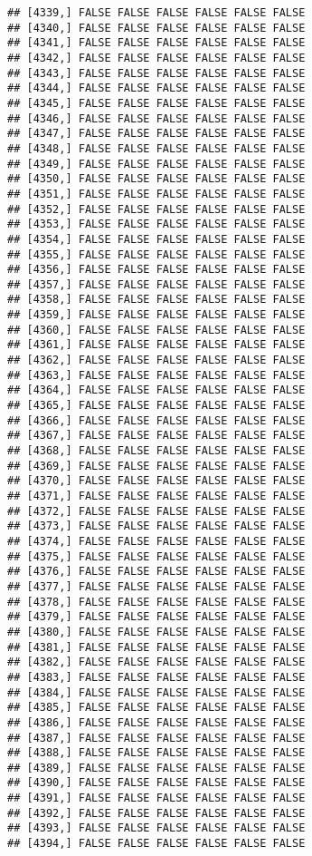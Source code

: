 \documentclass[
]{article}
\begin{document}
\begin{verbatim}
## [4339,] FALSE FALSE FALSE FALSE FALSE FALSE
## [4340,] FALSE FALSE FALSE FALSE FALSE FALSE
## [4341,] FALSE FALSE FALSE FALSE FALSE FALSE
## [4342,] FALSE FALSE FALSE FALSE FALSE FALSE
## [4343,] FALSE FALSE FALSE FALSE FALSE FALSE
## [4344,] FALSE FALSE FALSE FALSE FALSE FALSE
## [4345,] FALSE FALSE FALSE FALSE FALSE FALSE
## [4346,] FALSE FALSE FALSE FALSE FALSE FALSE
## [4347,] FALSE FALSE FALSE FALSE FALSE FALSE
## [4348,] FALSE FALSE FALSE FALSE FALSE FALSE
## [4349,] FALSE FALSE FALSE FALSE FALSE FALSE
## [4350,] FALSE FALSE FALSE FALSE FALSE FALSE
## [4351,] FALSE FALSE FALSE FALSE FALSE FALSE
## [4352,] FALSE FALSE FALSE FALSE FALSE FALSE
## [4353,] FALSE FALSE FALSE FALSE FALSE FALSE
## [4354,] FALSE FALSE FALSE FALSE FALSE FALSE
## [4355,] FALSE FALSE FALSE FALSE FALSE FALSE
## [4356,] FALSE FALSE FALSE FALSE FALSE FALSE
## [4357,] FALSE FALSE FALSE FALSE FALSE FALSE
## [4358,] FALSE FALSE FALSE FALSE FALSE FALSE
## [4359,] FALSE FALSE FALSE FALSE FALSE FALSE
## [4360,] FALSE FALSE FALSE FALSE FALSE FALSE
## [4361,] FALSE FALSE FALSE FALSE FALSE FALSE
## [4362,] FALSE FALSE FALSE FALSE FALSE FALSE
## [4363,] FALSE FALSE FALSE FALSE FALSE FALSE
## [4364,] FALSE FALSE FALSE FALSE FALSE FALSE
## [4365,] FALSE FALSE FALSE FALSE FALSE FALSE
## [4366,] FALSE FALSE FALSE FALSE FALSE FALSE
## [4367,] FALSE FALSE FALSE FALSE FALSE FALSE
## [4368,] FALSE FALSE FALSE FALSE FALSE FALSE
## [4369,] FALSE FALSE FALSE FALSE FALSE FALSE
## [4370,] FALSE FALSE FALSE FALSE FALSE FALSE
## [4371,] FALSE FALSE FALSE FALSE FALSE FALSE
## [4372,] FALSE FALSE FALSE FALSE FALSE FALSE
## [4373,] FALSE FALSE FALSE FALSE FALSE FALSE
## [4374,] FALSE FALSE FALSE FALSE FALSE FALSE
## [4375,] FALSE FALSE FALSE FALSE FALSE FALSE
## [4376,] FALSE FALSE FALSE FALSE FALSE FALSE
## [4377,] FALSE FALSE FALSE FALSE FALSE FALSE
## [4378,] FALSE FALSE FALSE FALSE FALSE FALSE
## [4379,] FALSE FALSE FALSE FALSE FALSE FALSE
## [4380,] FALSE FALSE FALSE FALSE FALSE FALSE
## [4381,] FALSE FALSE FALSE FALSE FALSE FALSE
## [4382,] FALSE FALSE FALSE FALSE FALSE FALSE
## [4383,] FALSE FALSE FALSE FALSE FALSE FALSE
## [4384,] FALSE FALSE FALSE FALSE FALSE FALSE
## [4385,] FALSE FALSE FALSE FALSE FALSE FALSE
## [4386,] FALSE FALSE FALSE FALSE FALSE FALSE
## [4387,] FALSE FALSE FALSE FALSE FALSE FALSE
## [4388,] FALSE FALSE FALSE FALSE FALSE FALSE
## [4389,] FALSE FALSE FALSE FALSE FALSE FALSE
## [4390,] FALSE FALSE FALSE FALSE FALSE FALSE
## [4391,] FALSE FALSE FALSE FALSE FALSE FALSE
## [4392,] FALSE FALSE FALSE FALSE FALSE FALSE
## [4393,] FALSE FALSE FALSE FALSE FALSE FALSE
## [4394,] FALSE FALSE FALSE FALSE FALSE FALSE

\end{verbatim}
\end{document}

